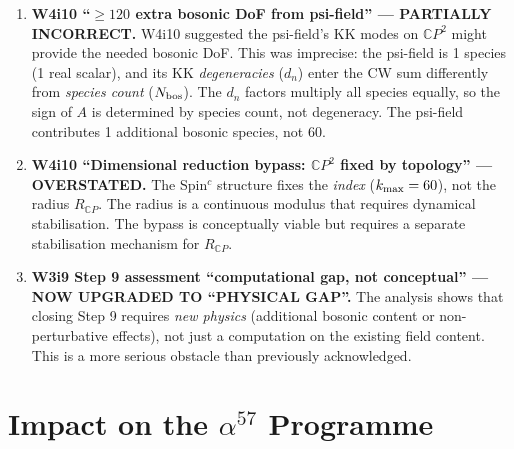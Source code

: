 \documentclass[11pt,a4paper]{article}
\newcommand{\CP}{\mathbb{C}P}
\newcommand{\kmax}{k_{\rm max}}
\newcommand{\Nbos}{N_{\rm bos}}
\begin{document}
\begin{enumerate}
\item \textbf{W4i10 ``$\geq 120$ extra bosonic DoF from psi-field''
  --- PARTIALLY INCORRECT.} W4i10 suggested the psi-field's KK
  modes on $\CP^2$ might provide the needed bosonic DoF. This was
  imprecise: the psi-field is 1 species (1 real scalar), and its
  KK \emph{degeneracies} ($d_n$) enter the CW sum differently from
  \emph{species count} ($\Nbos$). The $d_n$ factors multiply all
  species equally, so the sign of $A$ is determined by species count,
  not degeneracy. The psi-field contributes 1 additional bosonic
  species, not 60.

\item \textbf{W4i10 ``Dimensional reduction bypass: $\CP^2$ fixed
  by topology'' --- OVERSTATED.} The Spin$^c$ structure fixes the
  \emph{index} ($\kmax = 60$), not the radius $R_{\CP}$. The radius
  is a continuous modulus that requires dynamical stabilisation. The
  bypass is conceptually viable but requires a separate stabilisation
  mechanism for $R_{\CP}$.

\item \textbf{W3i9 Step 9 assessment ``computational gap, not
  conceptual'' --- NOW UPGRADED TO ``PHYSICAL GAP''.} The analysis
  shows that closing Step 9 requires \emph{new physics} (additional
  bosonic content or non-perturbative effects), not just a computation
  on the existing field content. This is a more serious obstacle than
  previously acknowledged.
\end{enumerate}


\section{Impact on the $\alpha^{57}$ Programme}
\label{sec:impact}
\end{document}
